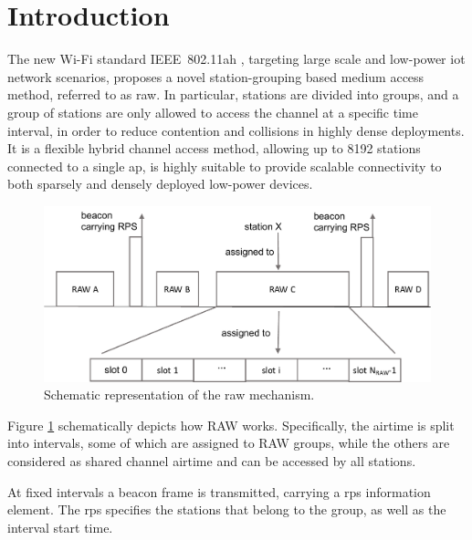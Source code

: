 \section{Introduction}

The new Wi-Fi standard IEEE~802.11ah \cite{80211ahStd}, targeting large scale and low-power \gls{iot} network scenarios, proposes a novel station-grouping based medium access method, referred to as \gls{raw}. In particular, stations are divided into groups, and a group of stations are only allowed to access the channel at a specific time interval, in order to reduce contention and collisions in highly dense deployments. It is a flexible hybrid channel access method, allowing up to 8192 stations connected to a single \gls{ap}, is highly suitable to provide scalable connectivity to both sparsely and densely deployed low-power devices. 


\begin{figure}[t]
  \centering
  \includegraphics[width=0.8\columnwidth]{figures/raw}
  \caption{Schematic representation of the \gls{raw} mechanism.\label{fig:RAW}}
\end{figure}


Figure \ref{fig:RAW} schematically depicts how RAW works. Specifically, the airtime is split into intervals, some of which are assigned to RAW groups, while the others are considered as shared channel airtime and can be accessed by all stations. 

At fixed intervals a beacon frame is transmitted,
carrying a \gls{rps} information element. The \gls{rps} specifies the stations that belong to the group, as
well as the interval start time.


